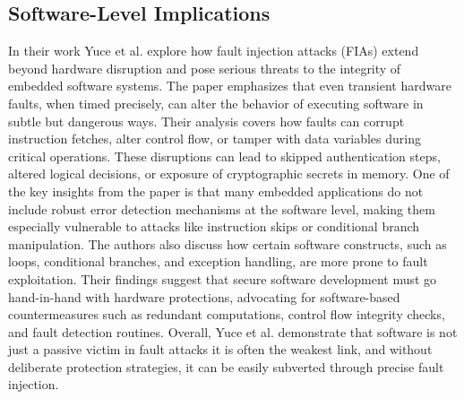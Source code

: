 \subsection*{Software-Level Implications \cite{yuce2020fault}}
In their work Yuce et al. explore how fault injection attacks (FIAs) extend beyond hardware disruption and pose serious threats to the integrity of embedded software systems. The paper emphasizes that even transient hardware faults, when timed precisely, can alter the behavior of executing software in subtle but dangerous ways. Their analysis covers how faults can corrupt instruction fetches, alter control flow, or tamper with data variables during critical operations. These disruptions can lead to skipped authentication steps, altered logical decisions, or exposure of cryptographic secrets in memory. One of the key insights from the paper is that many embedded applications do not include robust error detection mechanisms at the software level, making them especially vulnerable to attacks like instruction skips or conditional branch manipulation. The authors also discuss how certain software constructs, such as loops, conditional branches, and exception handling, are more prone to fault exploitation. Their findings suggest that secure software development must go hand-in-hand with hardware protections, advocating for software-based countermeasures such as redundant computations, control flow integrity checks, and fault detection routines. Overall, Yuce et al. demonstrate that software is not just a passive victim in fault attacks it is often the weakest link, and without deliberate protection strategies, it can be easily subverted through precise fault injection.


